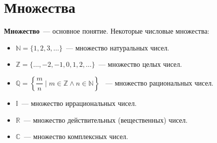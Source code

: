 \section{Множества}
\textbf{Множество}~--- основное понятие. Некоторые числовые множества:
\begin{itemize}
	\item $\mathbb N = \{ 1, 2, 3, \dots \}$~--- множество натуральных чисел.
	\item $\mathbb Z = \{ \dots, -2, -1, 0, 1, 2, \dots \}$~--- множество целых чисел.
	\item $\mathbb Q = \left\{ \dfrac{m}n \mid m \in \mathbb Z \land n \in \mathbb N \right\}$
	~--- множество рациональных чисел.
	\item $\mathbb I$~--- множество иррациональных чисел.
	\item $\mathbb R$~--- множество действительных (вещественных) чисел.
	\item $\mathbb C$~--- множество комплексных чисел.
\end{itemize}